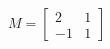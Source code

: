 \documentclass[preview]{standalone}
\begin{document}
\begin{align*}
M = \begin{bmatrix} 2 & 1 \\ -1 & 1 \end{bmatrix}
\end{align*}
\end{document}
